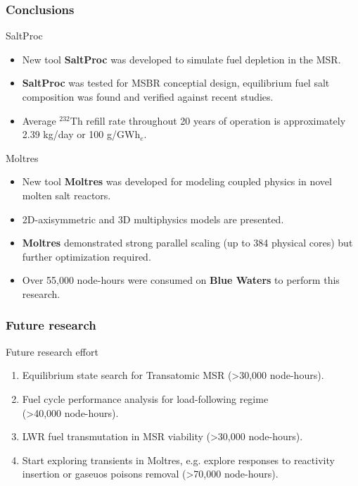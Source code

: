 \begin{frame}
  \frametitle{Conclusions}
        \begin{block}{SaltProc}
        \begin{itemize}
                \item New tool \textbf{SaltProc} was developed to simulate fuel depletion in the \gls{MSR}.
                \item \textbf{SaltProc} was tested for \gls{MSBR} conceptial design, equilibrium fuel salt composition was found and verified against recent studies.
		\item Average $^{232}$Th refill rate throughout 20 years of operation is approximately 2.39 kg/day or 100 g/GWh$_e$.
		\end{itemize}
		\end{block}
		\begin{block}{Moltres}
		\begin{itemize}
		\item New tool \textbf{Moltres} was developed for modeling coupled physics in novel molten salt reactors.
		\item 2D-axisymmetric and 3D multiphysics models are presented.
		\item \textbf{Moltres} demonstrated strong parallel scaling (up to 384 physical cores) but further optimization required.
		\item Over 55,000 node-hours were consumed on \textbf{Blue Waters} to perform this research.
        \end{itemize}
        \end{block}
        
\end{frame}

\begin{frame}
  \frametitle{Future research}
         
              \begin{block}{Future research effort}
                 \begin{enumerate}
                \item Equilibrium state search for Transatomic \gls{MSR} (\textgreater 30,000 node-hours).
                \item Fuel cycle performance analysis for load-following regime \\ (\textgreater 40,000 node-hours).
                \item \gls{LWR} fuel transmutation in \gls{MSR} viability (\textgreater 30,000 node-hours).
		\vspace*{0.15in}
                \item Start exploring transients in Moltres, e.g. explore responses to reactivity insertion or gaseuos poisons removal (\textgreater 70,000 node-hours).
               \end{enumerate}
               \end{block}
\end{frame}
